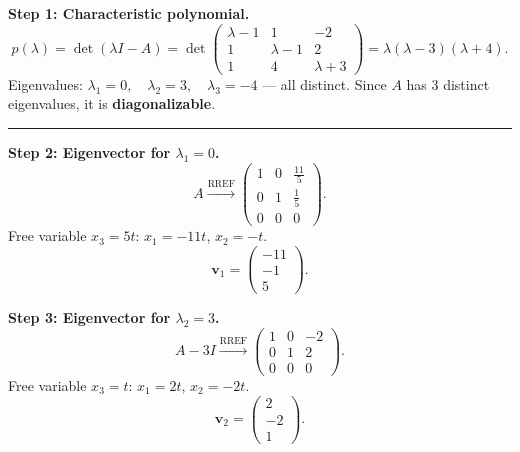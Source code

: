 \documentclass[12pt,a3paper]{article}
\begin{document}
\begin{tcolorbox}[enhanced,breakable,
  colback=cE!4,colframe=cE,boxrule=0.8pt,arc=5pt,
  title={\textbf{Answer --- Eigenvalues, Eigenvectors \& Diagonalization of
    $A=\begin{pmatrix}1&-1&2\\-1&1&-2\\-1&-4&-3\end{pmatrix}$}},
  fonttitle=\bfseries\color{white},colbacktitle=cE]

\textbf{Step 1: Characteristic polynomial.}
\[
  p(\lambda) = \det(\lambda I - A)
  = \det\begin{pmatrix}\lambda-1&1&-2\\1&\lambda-1&2\\1&4&\lambda+3\end{pmatrix}
  = \lambda(\lambda-3)(\lambda+4).
\]
Eigenvalues: $\boxed{\lambda_1 = 0,\quad \lambda_2 = 3,\quad \lambda_3 = -4}$ — all distinct.
Since $A$ has 3 distinct eigenvalues, it is \textbf{diagonalizable}.

\medskip\textcolor{cE}{\rule{\textwidth}{0.4pt}}

\textbf{Step 2: Eigenvector for $\lambda_1 = 0$.}
\[
  A \xrightarrow{\text{RREF}}
  \begin{pmatrix}1&0&\frac{11}{5}\\0&1&\frac{1}{5}\\0&0&0\end{pmatrix}.
\]
Free variable $x_3 = 5t$: $x_1 = -11t$, $x_2 = -t$.
\[
  \mathbf{v}_1 = \begin{pmatrix}-11\\-1\\5\end{pmatrix}.
\]

\textbf{Step 3: Eigenvector for $\lambda_2 = 3$.}
\[
  A - 3I \xrightarrow{\text{RREF}}
  \begin{pmatrix}1&0&-2\\0&1&2\\0&0&0\end{pmatrix}.
\]
Free variable $x_3 = t$: $x_1 = 2t$, $x_2 = -2t$.
\[
\mathbf{v}_2 = \begin{pmatrix}2\\-2\\1\end{pmatrix}.
\]


\end{tcolorbox}
\end{document}

